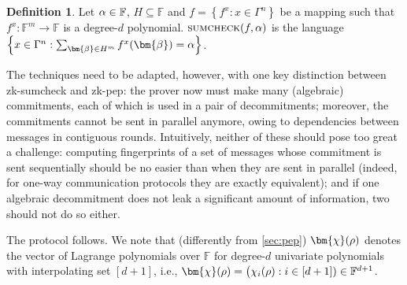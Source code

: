 \documentclass[10pt,a4paper]{article}
\theoremstyle{definition}
\newtheorem{definition}[theorem]{Definition}
\newcommand{\field}{\mathbb{F}}
\renewcommand{\set}[1]{\left\{#1\right\}}
\newcommand{\sumcheck}{\normalfont\textsc{sumcheck}\xspace}
\newcommand{\dimension}{m}
\newcommand{\degree}{d}
\newcommand{\evaluationpoint}{\bm{\fe2}}
\newcommand{\cubeside}{H}
\newcommand{\alphabet}{\Gamma}
\def\fe#1{
    \ifnum#1=1
        \alpha
    \else
    \ifnum#1=2
        \beta
    \else
    \ifnum#1=3
        \gamma
    \fi\fi\fi
}
\def\rfe#1{
    \ifnum#1=1
        \rho
    \else
    \ifnum#1=2
        \sigma
    \else
    \fi\fi
}
\begin{document}
\begin{definition}
    \label{def:sumcheck}
    Let $\fe1 \in \field$, $\cubeside \subseteq \field$ and $f = \set{f^x : x \in \alphabet^n}$ be a mapping such that $f^x: \field^\dimension \to \field$ is a degree-$\degree$ polynomial. $\sumcheck(f, \fe1)$ is the language $\set{x \in \alphabet^n : \sum_{\evaluationpoint \in \cubeside^\dimension}f^x(\evaluationpoint) = \fe1}$.
\end{definition}

The techniques need to be adapted, however, with one key distinction between \textsf{zk-sumcheck} and \textsf{zk-pep}: the prover now must make many (algebraic) commitments, each of which is used in a pair of decommitments; moreover, the commitments cannot be sent in parallel anymore, owing to dependencies between messages in contiguous rounds. Intuitively, neither of these should pose too great a challenge: computing fingerprints of a set of messages whose commitment is sent sequentially should be no easier than when they are sent in parallel (indeed, for one-way communication protocols they are exactly equivalent); and if one algebraic decommitment does not leak a significant amount of information, two should not do so either.

The protocol follows. We note that (differently from \cref{sec:pep}) $\bm{\chi}(\rfe1)$ denotes the vector of Lagrange polynomials over $\field$ for degree-$\degree$ univariate polynomials with interpolating set $[\degree + 1]$, i.e., $\bm{\chi}(\rfe1) = \big(\chi_i(\rfe1) : i \in [\degree + 1]) \in \field^{\degree + 1}$.
\end{document}

